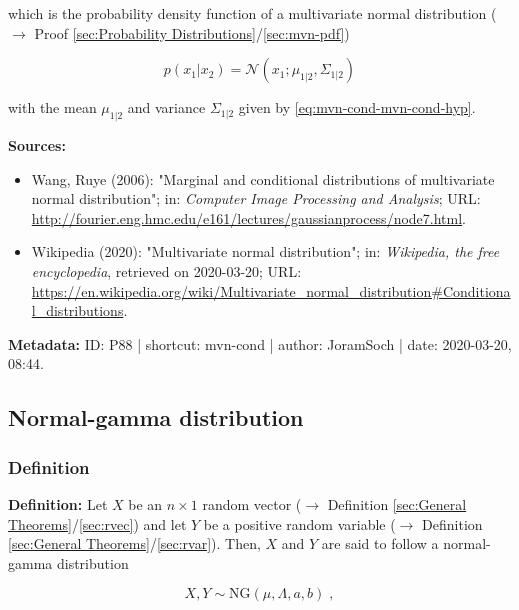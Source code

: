 \documentclass[a4paper,12pt,twoside]{book}
\begin{document}
which is the probability density function of a multivariate normal distribution ($\rightarrow$ Proof \ref{sec:Probability Distributions}/\ref{sec:mvn-pdf})

\begin{equation} \label{eq:mvn-cond-mvn-cond-s10}
p(x_1|x_2) = \mathcal{N}(x_1; \mu_{1|2}, \Sigma_{1|2})
\end{equation}

with the mean $\mu_{1 \vert 2}$ and variance $\Sigma_{1 \vert 2}$ given by \eqref{eq:mvn-cond-mvn-cond-hyp}.


\vspace{1em}
\textbf{Sources:}
\begin{itemize}
\item Wang, Ruye (2006): "Marginal and conditional distributions of multivariate normal distribution"; in: \textit{Computer Image Processing and Analysis}; URL: \url{http://fourier.eng.hmc.edu/e161/lectures/gaussianprocess/node7.html}.
\item Wikipedia (2020): "Multivariate normal distribution"; in: \textit{Wikipedia, the free encyclopedia}, retrieved on 2020-03-20; URL: \url{https://en.wikipedia.org/wiki/Multivariate_normal_distribution#Conditional_distributions}.
\end{itemize}


\vspace{1em}
\textbf{Metadata:} ID: P88 | shortcut: mvn-cond | author: JoramSoch | date: 2020-03-20, 08:44.
\vspace{1em}



\subsection{Normal-gamma distribution}

\subsubsection[\textit{Definition}]{Definition} \label{sec:ng}
\setcounter{equation}{0}

\textbf{Definition:} Let $X$ be an $n \times 1$ random vector ($\rightarrow$ Definition \ref{sec:General Theorems}/\ref{sec:rvec}) and let $Y$ be a positive random variable ($\rightarrow$ Definition \ref{sec:General Theorems}/\ref{sec:rvar}). Then, $X$ and $Y$ are said to follow a normal-gamma distribution

\begin{equation} \label{eq:ng-ng}
X,Y \sim \mathrm{NG}(\mu, \Lambda, a, b) \; ,
\end{equation}
\end{document}
